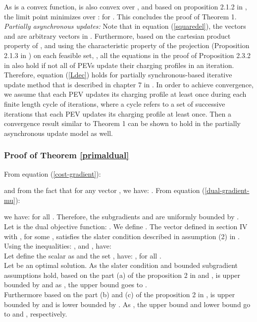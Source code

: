 \documentclass[12pt,draftcls,onecolumn]{IEEEtran}
\begin{document}
\indent As  is a convex function,  is also convex over , and based on proposition 2.1.2 in \cite{B99}, the limit point  minimizes  over :  for . This concludes the proof of Theorem 1.\\
\indent \emph{Partially asynchronous updates:} Note that in equation (\ref{squaredel}), the vectors  and  are arbitrary vectors in . Furthermore, based on the cartesian product property of , and using the characteristic property of the projection (Proposition 2.1.3 in \cite{B99}) on each feasible set, , all the equations in the proof of Proposition 2.3.2 in \cite{B99} also hold if not all of PEVs update their charging profiles in an iteration. Therefore, equation (\ref{Ldec}) holds for partially synchronous-based iterative update method that is described in chapter 7 in \cite{BT89}. In order to achieve convergence, we assume that each PEV updates its charging profile at least once during each finite length cycle of iterations, where a cycle refers to a set of successive iterations that each PEV updates its charging profile at least once. Then a convergence result similar to Theorem 1 can be shown to hold in the partially asynchronous update model as well. \\
\subsubsection{Proof of Theorem \ref{primaldual}}\label{A2}
\indent From equation (\ref{cost-gradient}):

 and from the fact that  for any vector , we have: . From equation (\ref{dual-gradient-mu}):

we have:  for all . Therefore, the subgradients  and  are uniformly bounded by .\\
\indent Let  is the dual objective function: . We define . The vector  defined in section IV with , for some , satisfies the slater condition described in assumption (2) in \cite{NO09}.\\
\indent Using the inequalities: ,  and , have:\\

Let define the scalar  as  and the set , have: , for all .\\
\indent Let  be an optimal solution. As the slater condition and bounded subgradient assumptions hold, based on the part (a) of the proposition 2 in \cite{NO09} and ,  is upper bounded by  and as , the upper bound goes to .\\
\indent Furthermore based on the part (b) and (c) of the proposition 2 in \cite{NO09},  is upper bounded by  and is lower bounded by . As , the upper bound and lower bound go to  and , respectively.
\end{document}
